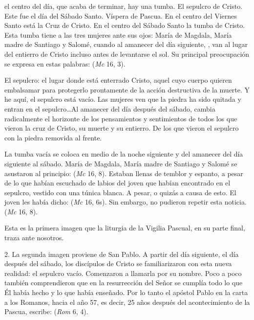 \begin{body}
 el centro del día, que acaba de terminar, hay una tumba. El sepulcro de Cristo. Este fue el día del Sábado Santo. Víspera de Pascua. En el centro del Viernes Santo está la Cruz de Cristo. En el centro del Sábado Santo la tumba de Cristo. Esta tumba tiene a las tres mujeres ante sus ojos: María de Magdala, María madre de Santiago y Salomé, cuando al amanecer del día siguiente, , van al lugar del entierro de Cristo incluso antes de levantarse el sol. Su principal preocupación se expresa en estas palabras:  (\textit{Mc} 16, 3). 

El sepulcro: el lugar donde está enterrado Cristo, aquel cuyo cuerpo quieren embalsamar para protegerlo prontamente de la acción destructiva de la muerte. Y he aquí, el sepulcro está vacío. Las mujeres ven que la piedra ha sido quitada y entran en el sepulcro\ldots Al amanecer del día después del sábado, cambia radicalmente el horizonte de los pensamientos y sentimientos de todos los que vieron la cruz de Cristo, su muerte y su entierro. De los que vieron el sepulcro con la piedra removida al frente. 

La tumba vacía se coloca en medio de la noche siguiente y del amanecer del día siguiente al sábado. María de Magdala, María madre de Santiago y Salomé se asustaron al principio:  (\textit{Mc} 16, 8). Estaban llenas de temblor y espanto, a pesar de lo que habían escuchado de labios del joven que habían encontrado en el sepulcro, vestido con una túnica blanca. A pesar, o quizás a causa de esto. El joven les había dicho:  (\textit{Mc} 16, 6s). Sin embargo, no pudieron repetir esta noticia.  (\textit{Mc} 16, 8).

Esta es la primera imagen que la liturgia de la Vigilia Pascual, en su parte final, traza ante nosotros. 

2. La segunda imagen proviene de San Pablo. A partir del día siguiente, el día después del sábado, los discípulos de Cristo se familiarizaron con esta nueva realidad: el sepulcro vacío. Comenzaron a llamarla por su nombre. Poco a poco también comprendieron que en la resurrección del Señor se cumplía todo lo que Él había hecho y lo que había enseñado. Por lo tanto el apóstol Pablo en la carta a los Romanos, hacia el año 57, es decir, 25 años después del acontecimiento de la Pascua, escribe:  (\textit{Rom} 6, 4). 


\end{body}
